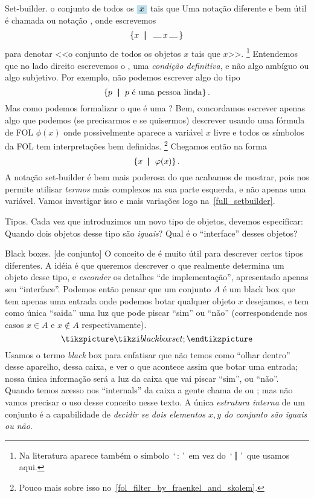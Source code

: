  Set-builder.
\label{set_builder}%
\label{definite_condition}%
%
%
 {o conjunto de todos os $\holed x$ tais que \thole}%
%
Uma notação diferente e bem útil é chamada
 ou notação ,
onde escrevemos
$$
\setst x {\text{\thole$x$\thole}}
$$
para denotar <<o conjunto de todos os objetos $x$ tais que \thole$x$\thole>>.
\footnote{Na literatura aparece também o símbolo~`\,$:$\,'~em vez
do~`$\;\mathord{\pmb{\mid}}\;$'~que usamos aqui.}
Entendemos que no lado direito escrevemos o ,
uma \emph{condição definitiva},
e não algo ambíguo ou algo subjetivo.  Por exemplo, não podemos escrever 
algo do tipo
$$
\left\{p \ \;\mathord{\pmb{\mid}}\;\  \text{$p$ é uma pessoa linda} \right\}.
$$
Mas como podemos formalizar o que é uma ?
Bem, concordamos escrever apenas algo que podemos (se precisarmos e se quisermos)
descrever usando uma fórmula de FOL $\phi(x)$ onde possivelmente aparece
a variável $x$ livre e todos os símbolos da FOL tem interpretações bem definidas.%
\footnote{Pouco mais sobre isso no~\ref{fol_filter_by_fraenkel_and_skolem}.}
Chegamos então na forma
$$
\left\{x \ \;\mathord{\pmb{\mid}}\;\ \varphi(x)\right\}.
$$
A notação set-builder é bem mais poderosa do que acabamos de mostrar,
pois nos permite utilisar \emph{termos} mais complexos na sua parte esquerda,
e não apenas uma variável.
Vamos investigar isso e mais variações logo na~\ref{full_setbuilder}.

\note Tipos.
Cada vez que introduzimos um novo tipo de objetos,
devemos especificar:
\beginol
\li Quando dois objetos desse tipo são \emph{iguais}?
\li Qual é o ``interface'' desses objetos?
\endol

\note Black boxes.
\label{blackbox_set}%
%
%
%
%
[de conjunto]%
%
O conceito de  é muito útil para descrever certos tipos diferentes.
A idéia é que queremos descrever o que realmente determina um objeto desse tipo,
e \emph{esconder} os detalhes ``de implementação'', apresentado apenas seu ``interface''.
Podemos então pensar que um conjunto $A$ é um black box que tem apenas uma
entrada onde podemos botar qualquer objeto $x$ desejamos, e tem como única
``saida'' uma luz que pode piscar ``sim'' ou ``não'' (correspondende nos casos
$x\in A$ e $x\notin A$ respectivamente).
$$
\tikzpicture
\tikzi blackboxset;
\endtikzpicture
$$
Usamos o termo \emph{black} box para enfatisar que não temos como ``olhar dentro''
desse aparelho, dessa caixa, e ver o que acontece assim que botar uma entrada;
nossa única informação será a luz da caixa que vai piscar ``sim'', ou ``não''.
Quando temos acesso nos ``internals'' da caixa a gente chama de 
ou ; mas não vamos precisar o uso desse conceito nesse texto.
\endgraf
A única \emph{estrutura interna} de um conjunto é a capabilidade de
\emph{decidir se dois elementos $x,y$ do conjunto são iguais ou não}.

